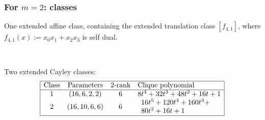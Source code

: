 \documentclass[pdf,sprung,slideColor,nocolorBG]{beamer}
\begin{document}
\begin{frame}
\frametitle{For $m=2$: classes}

One extended affine class, containing the extended translation class $[f_{4,1}]$, where 
$f_{4,1}(x) := x_0 x_1 + x_2 x_3$ is self dual.

~

Two extended Cayley classes:
\begin{align*}
\begin{array}{|cccl|}
\hline
\text{Class} &
\text{Parameters} & 
\text{2-rank} &
\text{Clique polynomial}
\\
\hline
1 &
(16, 6, 2, 2) & 
6 &
8t^{4} + 32t^{3} + 48t^{2} + 16t + 1
\\
2 &
(16, 10, 6, 6) & 
6 &
\begin{array}{l}
16t^{5} + 120t^{4} + 160t^{3} + 
\\
80t^{2} + 16t + 1
\end{array}
\\
\hline
\end{array}
\end{align*}
\end{frame}
\end{document}
